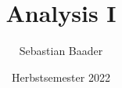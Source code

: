 \documentclass[11pt]{report}
\theoremstyle{definition}
\begin{document}
\renewcommand{\thechapter}{\Roman{chapter}}
\renewcommand{\thesection}{\arabic{section}}

\title{Analysis I}
\author{Sebastian Baader}
\date{Herbstsemester 2022}
\maketitle



\tableofcontents










\nocite{*}

\end{document}
